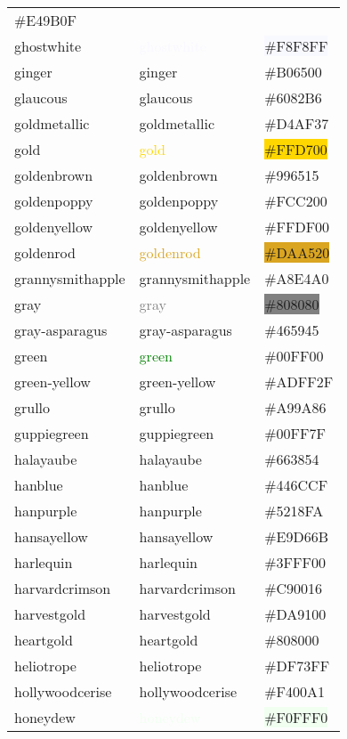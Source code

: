 \documentclass[
]{article}
\begin{document}
\begin{longtable}[]{@{}lll@{}}
\colorbox{gamboge}{\#E49B0F}\tabularnewline
ghostwhite & \textcolor{ghostwhite}{ghostwhite} &
\colorbox{ghostwhite}{\#F8F8FF}\tabularnewline
ginger & \textcolor{ginger}{ginger} &
\colorbox{ginger}{\#B06500}\tabularnewline
glaucous & \textcolor{glaucous}{glaucous} &
\colorbox{glaucous}{\#6082B6}\tabularnewline
goldmetallic & \textcolor{goldmetallic}{goldmetallic} &
\colorbox{goldmetallic}{\#D4AF37}\tabularnewline
gold & \textcolor{gold}{gold} & \colorbox{gold}{\#FFD700}\tabularnewline
goldenbrown & \textcolor{goldenbrown}{goldenbrown} &
\colorbox{goldenbrown}{\#996515}\tabularnewline
goldenpoppy & \textcolor{goldenpoppy}{goldenpoppy} &
\colorbox{goldenpoppy}{\#FCC200}\tabularnewline
goldenyellow & \textcolor{goldenyellow}{goldenyellow} &
\colorbox{goldenyellow}{\#FFDF00}\tabularnewline
goldenrod & \textcolor{goldenrod}{goldenrod} &
\colorbox{goldenrod}{\#DAA520}\tabularnewline
grannysmithapple & \textcolor{grannysmithapple}{grannysmithapple} &
\colorbox{grannysmithapple}{\#A8E4A0}\tabularnewline
gray & \textcolor{gray}{gray} & \colorbox{gray}{\#808080}\tabularnewline
gray-asparagus & \textcolor{gray-asparagus}{gray-asparagus} &
\colorbox{gray-asparagus}{\#465945}\tabularnewline
green & \textcolor{green}{green} &
\colorbox{electricgreen}{\#00FF00}\tabularnewline
green-yellow & \textcolor{green-yellow}{green-yellow} &
\colorbox{green-yellow}{\#ADFF2F}\tabularnewline
grullo & \textcolor{grullo}{grullo} &
\colorbox{grullo}{\#A99A86}\tabularnewline
guppiegreen & \textcolor{guppiegreen}{guppiegreen} &
\colorbox{guppiegreen}{\#00FF7F}\tabularnewline
halayaube & \textcolor{halayaube}{halayaube} &
\colorbox{halayaube}{\#663854}\tabularnewline
hanblue & \textcolor{hanblue}{hanblue} &
\colorbox{hanblue}{\#446CCF}\tabularnewline
hanpurple & \textcolor{hanpurple}{hanpurple} &
\colorbox{hanpurple}{\#5218FA}\tabularnewline
hansayellow & \textcolor{hansayellow}{hansayellow} &
\colorbox{arylideyellow}{\#E9D66B}\tabularnewline
harlequin & \textcolor{harlequin}{harlequin} &
\colorbox{harlequin}{\#3FFF00}\tabularnewline
harvardcrimson & \textcolor{harvardcrimson}{harvardcrimson} &
\colorbox{harvardcrimson}{\#C90016}\tabularnewline
harvestgold & \textcolor{harvestgold}{harvestgold} &
\colorbox{harvestgold}{\#DA9100}\tabularnewline
heartgold & \textcolor{heartgold}{heartgold} &
\colorbox{heartgold}{\#808000}\tabularnewline
heliotrope & \textcolor{heliotrope}{heliotrope} &
\colorbox{heliotrope}{\#DF73FF}\tabularnewline
hollywoodcerise & \textcolor{hollywoodcerise}{hollywoodcerise} &
\colorbox{fashionfuchsia}{\#F400A1}\tabularnewline
honeydew & \textcolor{honeydew}{honeydew} &
\colorbox{honeydew}{\#F0FFF0}\tabularnewline

\end{longtable}
\end{document}

